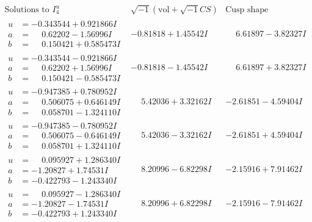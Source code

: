 \documentclass[1p]{elsarticle_modified}
\theoremstyle{definition}
\newcommand{\I}{\sqrt{-1}}
\begin{document}
$$\begin{array}{c|c|c}  
\text{Solutions to }I^u_{4}& \I (\text{vol} + \sqrt{-1}CS) & \text{Cusp shape}\\
 \hline 
\begin{aligned}
u &= -0.343544 + 0.921866 I \\
a &= \phantom{-}0.62202 - 1.56996 I \\
b &= \phantom{-}0.150421 + 0.585473 I\end{aligned}
 & -0.81818 + 1.45542 I & \phantom{-}6.61897 - 3.82327 I \\ \hline\begin{aligned}
u &= -0.343544 - 0.921866 I \\
a &= \phantom{-}0.62202 + 1.56996 I \\
b &= \phantom{-}0.150421 - 0.585473 I\end{aligned}
 & -0.81818 - 1.45542 I & \phantom{-}6.61897 + 3.82327 I \\ \hline\begin{aligned}
u &= -0.947385 + 0.780952 I \\
a &= \phantom{-}0.506075 + 0.646149 I \\
b &= \phantom{-}0.058701 - 1.324110 I\end{aligned}
 & \phantom{-}5.42036 + 3.32162 I & -2.61851 - 4.59404 I \\ \hline\begin{aligned}
u &= -0.947385 - 0.780952 I \\
a &= \phantom{-}0.506075 - 0.646149 I \\
b &= \phantom{-}0.058701 + 1.324110 I\end{aligned}
 & \phantom{-}5.42036 - 3.32162 I & -2.61851 + 4.59404 I \\ \hline\begin{aligned}
u &= \phantom{-}0.095927 + 1.286340 I \\
a &= -1.20827 + 1.74531 I \\
b &= -0.422793 - 1.243340 I\end{aligned}
 & \phantom{-}8.20996 - 6.82298 I & -2.15916 + 7.91462 I \\ \hline\begin{aligned}
u &= \phantom{-}0.095927 - 1.286340 I \\
a &= -1.20827 - 1.74531 I \\
b &= -0.422793 + 1.243340 I\end{aligned}
 & \phantom{-}8.20996 + 6.82298 I & -2.15916 - 7.91462 I \\ \hline\begin{aligned}

\end{aligned}
\end{array}$$
\end{document}
